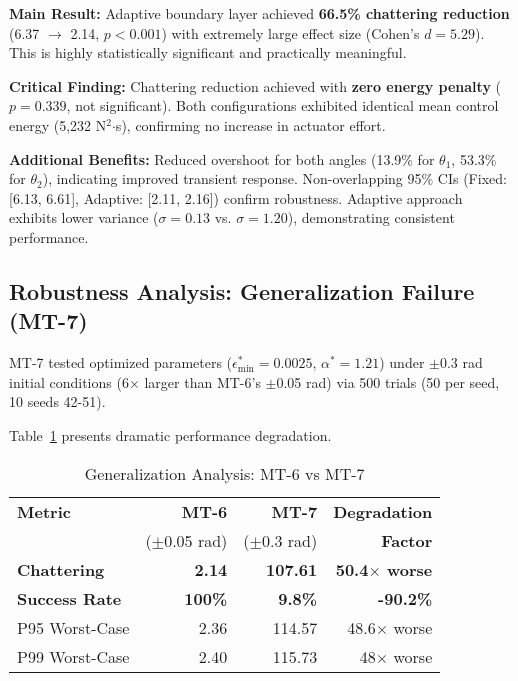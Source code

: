 \documentclass[conference]{IEEEtran}
\begin{document}
\textbf{Main Result:} Adaptive boundary layer achieved \textbf{66.5\% chattering reduction} (6.37 $\rightarrow$ 2.14, $p < 0.001$) with extremely large effect size (Cohen's $d = 5.29$). This is highly statistically significant and practically meaningful.

\textbf{Critical Finding:} Chattering reduction achieved with \textbf{zero energy penalty} ($p = 0.339$, not significant). Both configurations exhibited identical mean control energy (5,232 N$^2$$\cdot$s), confirming no increase in actuator effort.

\textbf{Additional Benefits:} Reduced overshoot for both angles (13.9\% for $\theta_1$, 53.3\% for $\theta_2$), indicating improved transient response. Non-overlapping 95\% CIs (Fixed: [6.13, 6.61], Adaptive: [2.11, 2.16]) confirm robustness. Adaptive approach exhibits lower variance ($\sigma = 0.13$ vs. $\sigma = 1.20$), demonstrating consistent performance.

\subsection{Robustness Analysis: Generalization Failure (MT-7)}

MT-7 tested optimized parameters ($\epsilon_{\min}^* = 0.0025$, $\alpha^* = 1.21$) under $\pm$0.3 rad initial conditions (6$\times$ larger than MT-6's $\pm$0.05 rad) via 500 trials (50 per seed, 10 seeds 42-51).

Table~\ref{tab:mt7} presents dramatic performance degradation.

\begin{table}[!t]
\caption{Generalization Analysis: MT-6 vs MT-7}
\label{tab:mt7}
\centering
\small
\begin{tabular}{@{}lrrr@{}}
\toprule
\textbf{Metric} & \textbf{MT-6} & \textbf{MT-7} & \textbf{Degradation} \\
 & ($\pm$0.05 rad) & ($\pm$0.3 rad) & \textbf{Factor} \\
\midrule
\textbf{Chattering} & \textbf{2.14} & \textbf{107.61} & \textbf{50.4$\times$ worse} \\
\textbf{Success Rate} & \textbf{100\%} & \textbf{9.8\%} & \textbf{-90.2\%} \\
P95 Worst-Case & 2.36 & 114.57 & 48.6$\times$ worse \\
P99 Worst-Case & ~2.40 & 115.73 & ~48$\times$ worse \\
\bottomrule
\end{tabular}
\end{table}
\end{document}
